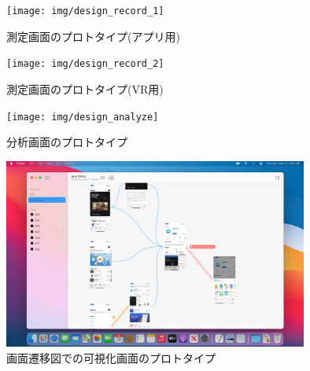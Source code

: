 \begin{figure}[htbp]
  \begin{minipage}{0.5\hsize}
    \begin{center}
       \texttt{[image: img/design\_record\_1]}
    \end{center}
    \caption{測定画面のプロトタイプ(アプリ用)}
    \label{fig:futurework1}
  \end{minipage}
    \begin{minipage}{0.5\hsize}
    \begin{center}
       \texttt{[image: img/design\_record\_2]}
    \end{center}
    \caption{測定画面のプロトタイプ(VR用)}
    \label{fig:futurework2}
  \end{minipage}
\end{figure}


\begin{figure}[htbp]
  \begin{minipage}{\hsize}
    \begin{center}
       \texttt{[image: img/design\_analyze]}
    \end{center}
    \caption{分析画面のプロトタイプ}
    \label{fig:futurework3}
  \end{minipage}
\end{figure}

\begin{figure}[htbp]
  \begin{minipage}{\hsize}
    \begin{center}
       \includegraphics[width=100mm]{img/design_storyboard}
    \end{center}
    \caption{画面遷移図での可視化画面のプロトタイプ}
    \label{fig:futurework4}
  \end{minipage}
\end{figure}
